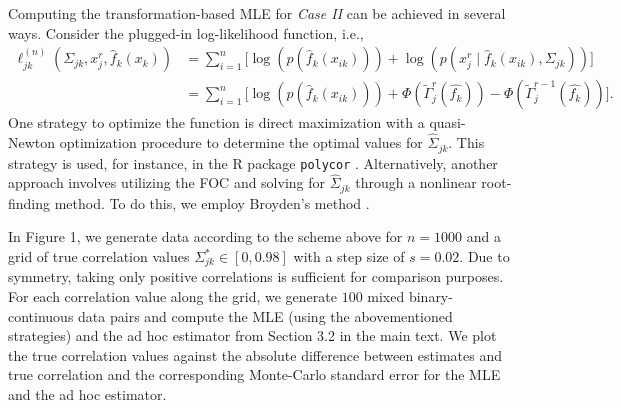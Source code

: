 \begin{change}
    Computing the transformation-based MLE for \textit{Case II} can be achieved in several ways. Consider the plugged-in log-likelihood function, i.e.,
    \begin{equation*}
        \begin{split}
            \ell_{jk}^{(n)}(\Sigma_{jk}, x_j^r,\hat{f}_k(x_k)) & = \sum_{i=1}^n \big[\log(p(\hat{f}_k(x_{ik}))) + \log(p(x_{j}^{r} \mid \hat{f}_k(x_{ik}), \Sigma_{jk}))\big]                      \\
            & = \sum_{i=1}^n \big[\log(p(\hat{f}_k(x_{ik}))) + \Phi(\tilde{\Gamma}_j^{r}(\hat{f_k})) - \Phi(\tilde{\Gamma}_j^{r-1}(\hat{f_k}))\big].
        \end{split}
    \end{equation*}
    One strategy to optimize the function is direct maximization with a quasi-Newton optimization procedure to determine the optimal values for $\hat\Sigma_{jk}$. This strategy is used, for instance, in the R package \texttt{polycor} \citep{polycor2022}. Alternatively, another approach involves utilizing the FOC and solving for $\hat\Sigma_{jk}$ through a nonlinear root-finding method. To do this, we employ Broyden's method \citep{Broyden1965}.

    In Figure 1, we generate data according to the scheme above for \(n=1000\) and a grid of true correlation values \(\Sigma^*_{jk} \in [0, 0.98]\) with a step size of \(s=0.02\). Due to symmetry, taking only positive correlations is sufficient for comparison purposes. For each correlation value along the grid, we generate \(100\) mixed binary-continuous data pairs and compute the MLE (using the abovementioned strategies) and the ad hoc estimator from Section 3.2 in the main text. We plot the true correlation values against the absolute difference between estimates and true correlation and the corresponding Monte-Carlo standard error for the MLE and the ad hoc estimator.


\end{change}
